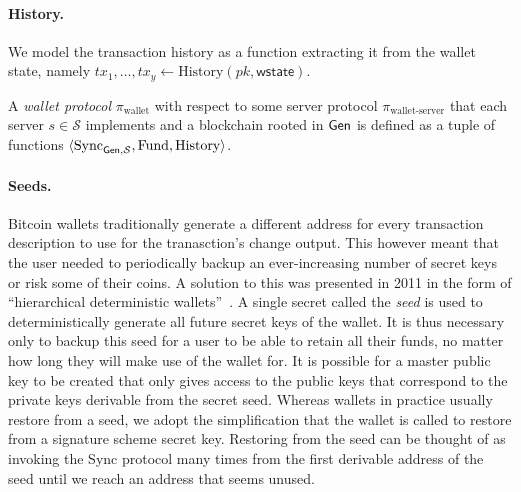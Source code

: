 \paragraph{History.}
We model the transaction history as a function extracting it from the wallet state, namely $tx_1, \dots, tx_y \gets \text{History}(pk, \textsf{wstate})$.

\begin{definition}
A \emph{wallet protocol} $\pi_\text{wallet}$ with respect to some server protocol $\pi_\text{wallet-server}$ that each server $s \in \mathcal{S}$ implements and a blockchain rooted in $\textsf{Gen}$ is defined as a tuple of functions $\langle\text{Sync}_{\textsf{Gen}, \mathcal{S}}, \text{Fund}, \text{History}\rangle$.
\end{definition}

\paragraph{Seeds.}
Bitcoin wallets traditionally generate a different address for every transaction description to use for the tranasction's change output. This however meant that the user needed to periodically backup an ever-increasing number of secret keys or risk some of their coins. A solution to this was presented in 2011 in the form of ``hierarchical deterministic wallets''~\cite{first-deterministic,bip32}. A single secret called the \emph{seed} is used to deterministically generate all future secret keys of the wallet. It is thus necessary only to backup this seed for a user to be able to retain all their funds, no matter how long they will make use of the wallet for. It is possible for a master public key to be created that only gives access to the public keys that correspond to the private keys derivable from the secret seed. Whereas wallets in practice usually restore from a seed, we adopt the simplification that the wallet is called to restore from a signature scheme secret key. Restoring from the seed can be thought of as invoking the Sync protocol many times from the first derivable address of the seed until we reach an address that seems unused.
